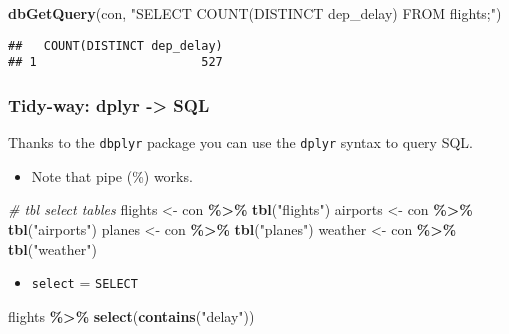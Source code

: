 \documentclass[
]{book}
\newenvironment{Shaded}{\begin{snugshade}}{\end{snugshade}}
\newcommand{\CommentTok}[1]{\textcolor[rgb]{0.56,0.35,0.01}{\textit{#1}}}
\newcommand{\KeywordTok}[1]{\textcolor[rgb]{0.13,0.29,0.53}{\textbf{#1}}}
\newcommand{\NormalTok}[1]{#1}
\newcommand{\OperatorTok}[1]{\textcolor[rgb]{0.81,0.36,0.00}{\textbf{#1}}}
\newcommand{\StringTok}[1]{\textcolor[rgb]{0.31,0.60,0.02}{#1}}
\providecommand{\tightlist}{%
  \setlength{\itemsep}{0pt}\setlength{\parskip}{0pt}}
\begin{document}
\begin{Shaded}
\begin{Highlighting}[]
\KeywordTok{dbGetQuery}\NormalTok{(con, }
           \StringTok{"SELECT COUNT(DISTINCT dep\_delay)}
\StringTok{           FROM flights;"}\NormalTok{)}
\end{Highlighting}
\end{Shaded}

\begin{verbatim}
##   COUNT(DISTINCT dep_delay)
## 1                       527
\end{verbatim}

\hypertarget{tidy-way-dplyr---sql}{%
\subsubsection{Tidy-way: dplyr -\textgreater{} SQL}\label{tidy-way-dplyr---sql}}

Thanks to the \texttt{dbplyr} package you can use the \texttt{dplyr} syntax to query SQL.

\begin{itemize}
\tightlist
\item
  Note that pipe (\%) works.
\end{itemize}

\begin{Shaded}
\begin{Highlighting}[]
\CommentTok{\# tbl select tables}
\NormalTok{flights \textless{}{-}}\StringTok{ }\NormalTok{con }\OperatorTok{\%\textgreater{}\%}\StringTok{ }\KeywordTok{tbl}\NormalTok{(}\StringTok{"flights"}\NormalTok{)}
\NormalTok{airports \textless{}{-}}\StringTok{ }\NormalTok{con }\OperatorTok{\%\textgreater{}\%}\StringTok{ }\KeywordTok{tbl}\NormalTok{(}\StringTok{"airports"}\NormalTok{)}
\NormalTok{planes \textless{}{-}}\StringTok{ }\NormalTok{con }\OperatorTok{\%\textgreater{}\%}\StringTok{ }\KeywordTok{tbl}\NormalTok{(}\StringTok{"planes"}\NormalTok{)}
\NormalTok{weather \textless{}{-}}\StringTok{ }\NormalTok{con }\OperatorTok{\%\textgreater{}\%}\StringTok{ }\KeywordTok{tbl}\NormalTok{(}\StringTok{"weather"}\NormalTok{)}
\end{Highlighting}
\end{Shaded}

\begin{itemize}
\tightlist
\item
  \texttt{select} = \texttt{SELECT}
\end{itemize}

\begin{Shaded}
\begin{Highlighting}[]
\NormalTok{flights }\OperatorTok{\%\textgreater{}\%}\StringTok{ }
\StringTok{  }\KeywordTok{select}\NormalTok{(}\KeywordTok{contains}\NormalTok{(}\StringTok{"delay"}\NormalTok{))}
\end{Highlighting}
\end{Shaded}
\end{document}
